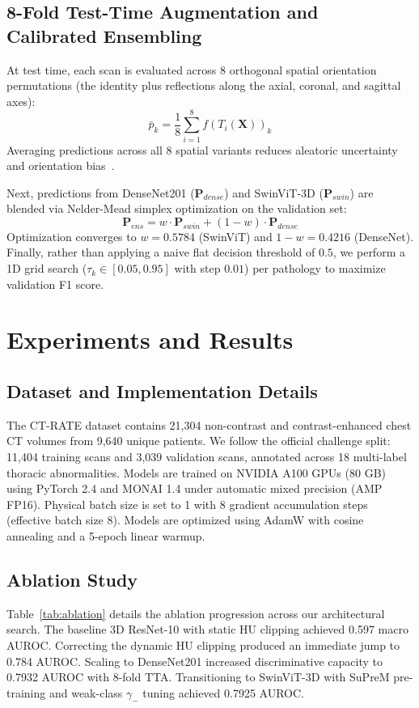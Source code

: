 \documentclass[runningheads]{llncs}
\begin{document}
\subsection{8-Fold Test-Time Augmentation and Calibrated Ensembling}
At test time, each scan is evaluated across 8 orthogonal spatial orientation permutations (the identity plus reflections along the axial, coronal, and sagittal axes):
\begin{equation}
\bar{p}_k = \frac{1}{8} \sum_{i=1}^8 f(T_i(\mathbf{X}))_k
\end{equation}
Averaging predictions across all 8 spatial variants reduces aleatoric uncertainty and orientation bias~\cite{wang2019}.

Next, predictions from DenseNet201 ($\mathbf{P}_{dense}$) and SwinViT-3D ($\mathbf{P}_{swin}$) are blended via Nelder-Mead simplex optimization on the validation set:
\begin{equation}
\mathbf{P}_{ens} = w \cdot \mathbf{P}_{swin} + (1 - w) \cdot \mathbf{P}_{dense}
\end{equation}
Optimization converges to $w = 0.5784$ (SwinViT) and $1 - w = 0.4216$ (DenseNet). Finally, rather than applying a naive flat decision threshold of $0.5$, we perform a 1D grid search ($\tau_k \in [0.05, 0.95]$ with step $0.01$) per pathology to maximize validation F1 score.

\section{Experiments and Results}

\subsection{Dataset and Implementation Details}
The CT-RATE dataset contains 21,304 non-contrast and contrast-enhanced chest CT volumes from 9,640 unique patients. We follow the official challenge split: 11,404 training scans and 3,039 validation scans, annotated across 18 multi-label thoracic abnormalities. Models are trained on NVIDIA A100 GPUs (80 GB) using PyTorch 2.4 and MONAI 1.4 under automatic mixed precision (AMP FP16). Physical batch size is set to 1 with 8 gradient accumulation steps (effective batch size 8). Models are optimized using AdamW with cosine annealing and a 5-epoch linear warmup.

\subsection{Ablation Study}
Table~\ref{tab:ablation} details the ablation progression across our architectural search. The baseline 3D ResNet-10 with static HU clipping achieved 0.597 macro AUROC. Correcting the dynamic HU clipping produced an immediate jump to 0.784 AUROC. Scaling to DenseNet201 increased discriminative capacity to 0.7932 AUROC with 8-fold TTA. Transitioning to SwinViT-3D with SuPreM pre-training and weak-class $\gamma_-$ tuning achieved 0.7925 AUROC.
\end{document}
